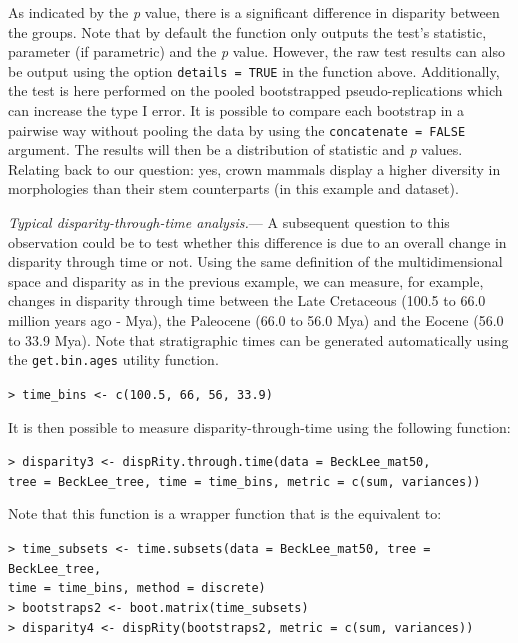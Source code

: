 \documentclass[12pt,letterpaper]{article}
\renewcommand{\subsubsection}[1]{%
\vspace{2ex}
\noindent
\textit{#1.}---}
\begin{document}
\bigskip
As indicated by the \textit{p} value, there is a significant difference in disparity between the groups.
Note that by default the function only outputs the test's statistic, parameter (if parametric) and the \textit{p} value. However, the raw test results can also be output using the option \texttt{details = TRUE} in the function above.
Additionally, the test is here performed on the pooled bootstrapped pseudo-replications which can increase the type I error.
It is possible to compare each bootstrap in a pairwise way without pooling the data by using the \texttt{concatenate = FALSE} argument.
The results will then be a distribution of statistic and \textit{p} values.
Relating back to our question: yes, crown mammals display a higher diversity in morphologies than their stem counterparts (in this example and dataset).

\subsubsection{Typical disparity-through-time analysis}
A subsequent question to this observation could be to test whether this difference is due to an overall change in disparity through time or not.
Using the same definition of the multidimensional space and disparity as in the previous example, we can measure, for example, changes in disparity through time between the Late Cretaceous (100.5 to 66.0 million years ago - Mya), the Paleocene (66.0 to 56.0 Mya) and the Eocene (56.0 to 33.9 Mya).
Note that stratigraphic times can be generated automatically using the \texttt{get.bin.ages} utility function.

\noindent
\texttt{> time\_bins <- c(100.5, 66, 56, 33.9)}

It is then possible to measure disparity-through-time using the following function:

\noindent
\texttt{> disparity3 <- dispRity.through.time(data = BeckLee\_mat50,}\\
\texttt{tree = BeckLee\_tree, time = time\_bins, metric = c(sum, variances))}

\noindent Note that this function is a wrapper function that is the equivalent to:

\noindent \texttt{> time\_subsets <- time.subsets(data = BeckLee\_mat50, tree = BeckLee\_tree,}\\ \texttt{time = time\_bins, method = \textquotedbl discrete\textquotedbl)}\\
\noindent \texttt{> bootstraps2 <- boot.matrix(time\_subsets)}\\
\noindent \texttt{> disparity4 <- dispRity(bootstraps2, metric = c(sum, variances))}\\
\end{document}
